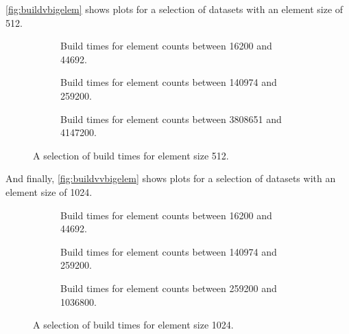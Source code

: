\autoref{fig:buildvbigelem} shows plots for a selection of datasets with an element size of 512.

\begin{figure}[H]
    \centering
    \begin{subfigure}{0.458\textwidth}
        
        \caption[Build times for element counts between 16200 and 44692.]{Build times for element counts between 16200 and 44692.}
        \label{sfig:buildvbigelemsmall}
    \end{subfigure}\hfill
    \begin{subfigure}{0.458\textwidth}
        
        \caption[Build times for element counts between 140974 and 259200.]{Build times for element counts between 140974 and 259200.}
        \label{sfig:buildvbigelemmedium}
    \end{subfigure}\hfill
    \begin{subfigure}{0.458\textwidth}
        
        \caption[Build times for element counts between 3808651 and 4147200.]{Build times for element counts between 3808651 and 4147200.}
        \label{sfig:buildvbigelemlarge}
    \end{subfigure}
    \caption[A selection of build times for element size 512.]{A selection of build times for element size 512.}
    \label{fig:buildvbigelem}
\end{figure}

And finally, \autoref{fig:buildvvbigelem} shows plots for a selection of datasets with an element size of 1024.

\begin{figure}[H]
    \centering
    \begin{subfigure}{0.458\textwidth}
        
        \caption[Build times for element counts between 16200 and 44692.]{Build times for element counts between 16200 and 44692.}
        \label{sfig:buildvvbigelemsmall}
    \end{subfigure}\hfill
    \begin{subfigure}{0.458\textwidth}
        
        \caption[Build times for element counts between 140974 and 259200.]{Build times for element counts between 140974 and 259200.}
        \label{sfig:buildvvbigelemmedium}
    \end{subfigure}\hfill
    \begin{subfigure}{0.458\textwidth}
        
        \caption[Build times for element counts between 259200 and 1036800.]{Build times for element counts between 259200 and 1036800.}
        \label{sfig:buildvvbigelemlarge}
    \end{subfigure}
    \caption[A selection of build times for element size 1024.]{A selection of build times for element size 1024.}
    \label{fig:buildvvbigelem}
\end{figure}

